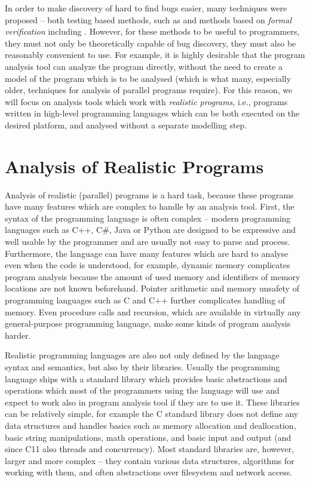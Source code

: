 In order to make discovery of hard to find bugs easier, many techniques were proposed -- both testing based methods, such as  and methods based on \emph{formal verification} including .
However, for these methods to be useful to programmers, they must not only be theoretically capable of bug discovery, they must also be reasonably convenient to use.
For example, it is highly desirable that the program analysis tool can analyze the program directly, without the need to create a model of the program which is to be analysed (which is what many, especially older, techniques for analysis of parallel programs require).
For this reason, we will focus on analysis tools which work with \emph{realistic programs}, i.e., programs written in high-level programming languages which can be both executed on the desired platform, and analysed without a separate modelling step.

\section{Analysis of Realistic Programs}

Analysis of realistic (parallel) programs is a hard task, because these programs have many features which are complex to handle by an analysis tool.
First, the syntax of the programming language is often complex -- modern programming languages such as C++, C\#, Java or Python are designed to be expressive and well usable by the programmer and are usually not easy to parse and process.
Furthermore, the language can have many features which are hard to analyse even when the code is understood, for example, dynamic memory complicates program analysis because the amount of used memory and identifiers of memory locations are not known beforehand.
Pointer arithmetic and memory unsafety of programming languages such as C and C++ further complicates handling of memory.
Even procedure calls and recursion, which are available in virtually any general-purpose programming language, make some kinds of program analysis harder.

Realistic programming languages are also not only defined by the language syntax and semantics, but also by their libraries.
Usually the programming language ships with a standard library which provides basic abstractions and operations which most of the programmers using the language will use and expect to work also in program analysis tool if they are to use it.
These libraries can be relatively simple, for example the C standard library does not define any data structures and handles basics such as memory allocation and deallocation, basic string manipulations, math operations, and basic input and output (and since C11 also threads and concurrency).
Most standard libraries are, however, larger and more complex -- they contain various data structures, algorithms for working with them, and often abstractions over filesystem and network access.

